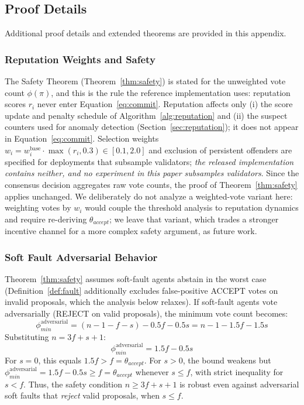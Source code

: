 \documentclass{article}
\begin{document}
\subsection{Proof Details}

Additional proof details and extended theorems are provided in this appendix.

\subsubsection{Reputation Weights and Safety}

The Safety Theorem (Theorem~\ref{thm:safety}) is stated for the unweighted vote count $\phi(\pi)$, and this is the rule the reference implementation uses: reputation scores $r_i$ never enter Equation~\ref{eq:commit}. Reputation affects only (i) the score update and penalty schedule of Algorithm~\ref{alg:reputation} and (ii) the suspect counters used for anomaly detection (Section~\ref{sec:reputation}); it does not appear in Equation~\ref{eq:commit}. Selection weights $w_i = w^{\text{base}}_i \cdot \max(r_i, 0.3) \in [0.1, 2.0]$ and exclusion of persistent offenders are specified for deployments that subsample validators; \emph{the released implementation contains neither, and no experiment in this paper subsamples validators}. Since the consensus decision aggregates raw vote counts, the proof of Theorem~\ref{thm:safety} applies unchanged. We deliberately do not analyze a weighted-vote variant here: weighting votes by $w_i$ would couple the threshold analysis to reputation dynamics and require re-deriving $\theta_{accept}$; we leave that variant, which trades a stronger incentive channel for a more complex safety argument, as future work.

\subsubsection{Soft Fault Adversarial Behavior}\label{app:softfault}

Theorem~\ref{thm:safety} assumes soft-fault agents abstain in the worst case (Definition~\ref{def:fault} additionally excludes false-positive ACCEPT votes on invalid proposals, which the analysis below relaxes). If soft-fault agents vote adversarially (REJECT on valid proposals), the minimum vote count becomes:
\begin{equation}
    \phi_{min}^{\text{adversarial}} = (n - 1 - f - s) - 0.5f - 0.5s = n - 1 - 1.5f - 1.5s
\end{equation}
Substituting $n = 3f + s + 1$:
\begin{equation}
    \phi_{min}^{\text{adversarial}} = 1.5f - 0.5s
\end{equation}
For $s = 0$, this equals $1.5f > f = \theta_{accept}$. For $s > 0$, the bound weakens but $\phi_{min}^{\text{adversarial}} = 1.5f - 0.5s \geq f = \theta_{accept}$ whenever $s \leq f$, with strict inequality for $s < f$. Thus, the safety condition $n \geq 3f + s + 1$ is robust even against adversarial soft faults that \emph{reject} valid proposals, when $s \leq f$.
\end{document}
